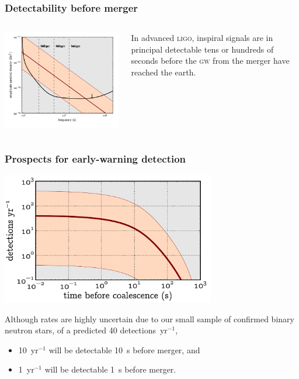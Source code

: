 \documentclass{beamer}
\begin{document}
\begin{frame}
	\frametitle{Detectability before merger}
	\begin{columns}
		\begin{column}{0.7\textwidth}
			\includegraphics[width=\textwidth]{figures/snr_psd}
		\end{column}
		\begin{column}{0.3\textwidth}
			In advanced \textsc{ligo}, inspiral signals are in principal detectable {\color{ink3}tens or hundreds of seconds} before the \textsc{gw} from the merger have reached the earth.
		\end{column}
	\end{columns}
\end{frame}

\begin{frame}
	\frametitle{Prospects for early-warning detection}
	\begin{center}
		\includegraphics[width=0.7\textwidth]{figures/snr_in_time}
	\end{center}

	Although rates are highly uncertain due to our small sample of confirmed binary neutron stars, of a predicted 40 detections~yr$^{-1}$,
	\begin{itemize}
		\item 10~yr$^{-1}$ will be detectable 10~s before merger, and
		\item 1~yr$^{-1}$ will be detectable 1~s before merger.
	\end{itemize}
\end{frame}
\end{document}
